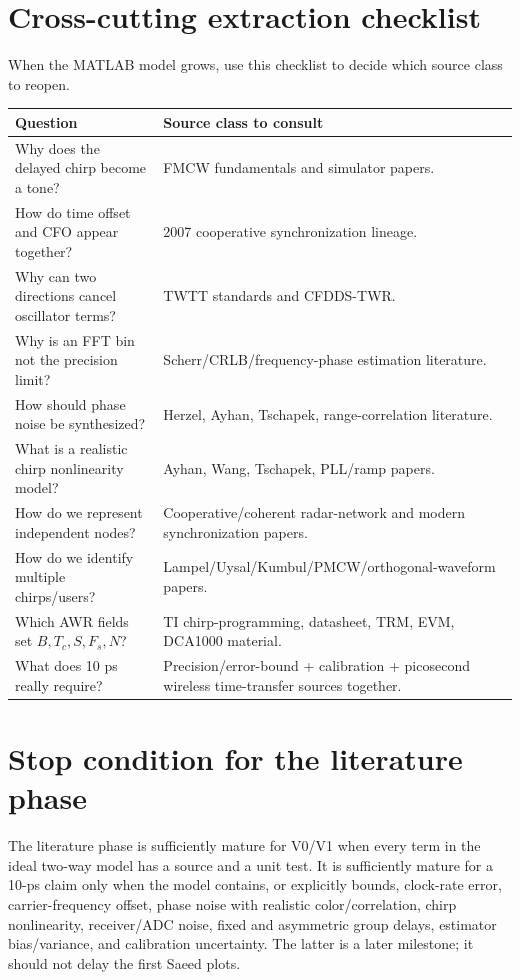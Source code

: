\documentclass[10.5pt]{article}
\begin{document}
\section{Cross-cutting extraction checklist}
When the MATLAB model grows, use this checklist to decide which source class to reopen.
\begin{longtable}{p{}p{}}
\toprule Question & Source class to consult \\ \midrule
Why does the delayed chirp become a tone? & FMCW fundamentals and simulator papers. \\
How do time offset and CFO appear together? & 2007 cooperative synchronization lineage. \\
Why can two directions cancel oscillator terms? & TWTT standards and CFDDS-TWR. \\
Why is an FFT bin not the precision limit? & Scherr/CRLB/frequency-phase estimation literature. \\
How should phase noise be synthesized? & Herzel, Ayhan, Tschapek, range-correlation literature. \\
What is a realistic chirp nonlinearity model? & Ayhan, Wang, Tschapek, PLL/ramp papers. \\
How do we represent independent nodes? & Cooperative/coherent radar-network and modern synchronization papers. \\
How do we identify multiple chirps/users? & Lampel/Uysal/Kumbul/PMCW/orthogonal-waveform papers. \\
Which AWR fields set $B,T_c,S,F_s,N$? & TI chirp-programming, datasheet, TRM, EVM, DCA1000 material. \\
What does 10 ps really require? & Precision/error-bound + calibration + picosecond wireless time-transfer sources together. \\
\bottomrule
\end{longtable}

\section{Stop condition for the literature phase}
The literature phase is sufficiently mature for V0/V1 when every term in the ideal two-way model has a source and a unit test. It is sufficiently mature for a 10-ps claim only when the model contains, or explicitly bounds, clock-rate error, carrier-frequency offset, phase noise with realistic color/correlation, chirp nonlinearity, receiver/ADC noise, fixed and asymmetric group delays, estimator bias/variance, and calibration uncertainty. The latter is a later milestone; it should not delay the first Saeed plots.
\end{document}
